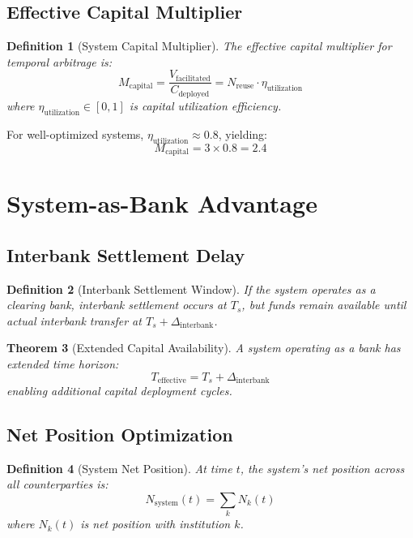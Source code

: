 \documentclass[12pt]{article}
\newtheorem{theorem}{Theorem}
\newtheorem{definition}[theorem]{Definition}
\begin{document}
\subsection{Effective Capital Multiplier}

\begin{definition}[System Capital Multiplier]
The effective capital multiplier for temporal arbitrage is:
$$
M_{\text{capital}} = \frac{V_{\text{facilitated}}}{C_{\text{deployed}}} = N_{\text{reuse}} \cdot \eta_{\text{utilization}}
$$
where $\eta_{\text{utilization}} \in [0,1]$ is capital utilization efficiency.
\end{definition}

For well-optimized systems, $\eta_{\text{utilization}} \approx 0.8$, yielding:
$$
M_{\text{capital}} = 3 \times 0.8 = 2.4
$$

\section{System-as-Bank Advantage}

\subsection{Interbank Settlement Delay}

\begin{definition}[Interbank Settlement Window]
If the system operates as a clearing bank, interbank settlement occurs at $T_s$, but funds remain available until actual interbank transfer at $T_s + \Delta_{\text{interbank}}$.
\end{definition}

\begin{theorem}[Extended Capital Availability]
A system operating as a bank has extended time horizon:
$$
T_{\text{effective}} = T_s + \Delta_{\text{interbank}}
$$
enabling additional capital deployment cycles.
\end{theorem}

\subsection{Net Position Optimization}

\begin{definition}[System Net Position]
At time $t$, the system's net position across all counterparties is:
$$
N_{\text{system}}(t) = \sum_{k} N_k(t)
$$
where $N_k(t)$ is net position with institution $k$.
\end{definition}
\end{document}
